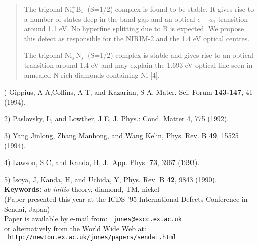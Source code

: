 {\begin{abstract}
The trigonal Ni$_s^+$B$_s^-$ (S=1/2) complex is found to be stable.
It gives rise to a number of states deep in the band-gap and an
optical $e-a_1$ transition around 1.1 eV.  No hyperfine splitting due
to B is expected.  We propose this defect as responsible for the
NIRIM-2 and the 1.4 eV optical centres.

The trigonal Ni$_s^-$N$_s^+$ (S=1/2) complex is stable and gives rise
to an optical transition around 1.4 eV and may explain the 1.693 eV
optical line seen in annealed N rich diamonds containing Ni [4].
\end{abstract}

) Gippius, A A,Collins, A T, and Kazarian, S A, Mater.  Sci. Forum
{\bf 143-147}, 41 (1994).

2) Paslovsky, L, and Lowther, J E, J. Phys.: Cond. Matter 4, 775
(1992).

3) Yang Jinlong, Zhang Manhong, and Wang Kelin, Phys. Rev. B {\bf 49},
15525 (1994).

4) Lawson, S C, and Kanda, H, J.\ App. Phys. {\bf 73}, 3967 (1993).

5) Isoya, J, Kanda, H, and Uchida, Y, Phys. Rev. B {\bf 42}, 9843 (1990). \\

\noindent
{\bf Keywords:} {\it ab initio} theory, diamond, TM, nickel \\

\noindent
(Paper presented this year at the ICDS '95 International Defects Conference 
in Sendai, Japan)\\
\ni Paper is available by e-mail from: \verb+ jones@excc.ex.ac.uk + \\
\ni or alternatively from the World Wide Web at: \\
\ni \verb+ http://newton.ex.ac.uk/jones/papers/sendai.html +\\

}
